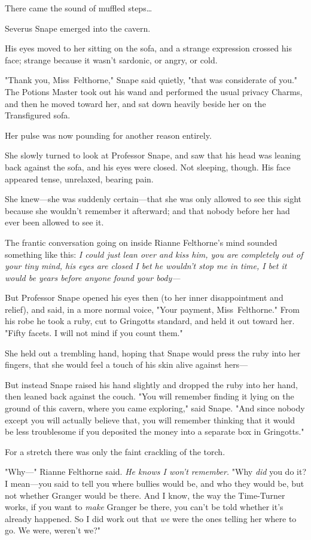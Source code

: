 There came the sound of muffled steps{\ldots}

Severus Snape emerged into the cavern.

His eyes moved to her sitting on the sofa, and a strange expression crossed his
face; strange because it wasn't sardonic, or angry, or cold.

"Thank you, Miss~Felthorne," Snape said quietly, "that was considerate of you."
The Potions Master took out his wand and performed the usual privacy Charms,
and then he moved toward her, and sat down heavily beside her on the
Transfigured sofa.

Her pulse was now pounding for another reason entirely.

She slowly turned to look at Professor Snape, and saw that his head was leaning
back against the sofa, and his eyes were closed. Not sleeping, though. His face
appeared tense, unrelaxed, bearing pain.

She knew---she was suddenly certain---that she was only allowed to see this
sight because she wouldn't remember it afterward; and that nobody before her
had ever been allowed to see it.

The frantic conversation going on inside Rianne Felthorne's mind sounded
something like this: \emph{I could just lean over and kiss him, you are
completely out of your tiny mind, his eyes are closed I bet he wouldn't stop me
in time, I bet it would be years before anyone found your body---}

But Professor Snape opened his eyes then (to her inner disappointment and
relief), and said, in a more normal voice, "Your payment, Miss~Felthorne." From
his robe he took a ruby, cut to Gringotts standard, and held it out toward her.
"Fifty facets. I will not mind if you count them."

She held out a trembling hand, hoping that Snape would press the ruby into her
fingers, that she would feel a touch of his skin alive against hers---

But instead Snape raised his hand slightly and dropped the ruby into her hand,
then leaned back against the couch. "You will remember finding it lying on the
ground of this cavern, where you came exploring," said Snape. "And since nobody
except you will actually believe that, you will remember thinking that it would
be less troublesome if you deposited the money into a separate box in
Gringotts."

For a stretch there was only the faint crackling of the torch.

"Why---" Rianne Felthorne said. \emph{He knows I won't remember.} "Why
\emph{did} you do it? I mean---you said to tell you where bullies would be, and
who they would be, but not whether Granger would be there. And I know, the way
the Time-Turner works, if you want to \emph{make} Granger be there, you can't
be told whether it's already happened. So I did work out that \emph{we} were
the ones telling her where to go. We were, weren't we?"

